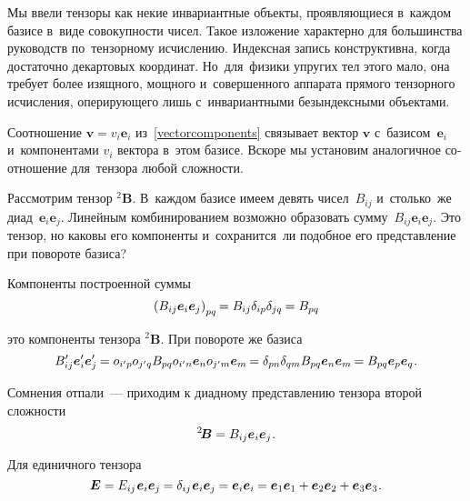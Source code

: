 \label{para:polyadicrepresentation}

\begin{otherlanguage}{russian}

Мы ввели тензоры как некие инвариантные объекты, проявляющиеся в~каждом базисе в~виде совокупности чисел. Такое изложение характерно для большинства руководств по~тензорному исчислению. Индексная запись конструктивна, когда достаточно декартовых координат. Но~для~физики упругих тел этого мало, она требует более изящного, мощного и~совершенного аппарата прямого тензорного исчисления, оперирующего лишь с~инвариантными безындексными объектами.

Соотношение ${\bm{v} = v_i \bm{e}_i}$ из~\eqref{vectorcomponents} связывает вектор ${\bm{v}}$ с~базисом~${\bm{e}_i}$ и~компонентами ${v_i}$ вектора в~этом базисе. Вскоре мы установим аналогичное соотношение для~тензора любой сложности.

Рассмотрим тензор ${^2\!\bm{B}}$. В~каждом базисе имеем девять чисел~${B_{ij}}$ и~столько~же диад~${\bm{e}_i \bm{e}_j}$. Линейным комбинированием возможно образовать сумму~${B_{ij} \bm{e}_i \bm{e}_j}$. Это тензор, но каковы его компоненты и~сохранится~ли подобное его представление при повороте базиса?

Компоненты построенной суммы
\[
\left( B_{ij} \bm{e}_i \bm{e}_j \right)_{pq} \hspace{-0.2ex} = B_{ij} \delta_{ip} \delta_{jq} \hspace{-0.1ex} = B_{pq}
\]

\vspace{-0.1em} \noindent это компоненты тензора ${^2\!\bm{B}}$. При повороте же базиса
\[
B'_{ij} \bm{e}'_{i} \bm{e}'_{j} \hspace{-0.1ex} = o_{i'p} o_{j'q} B_{pq} o_{i'n} \bm{e}_n o_{j'm} \bm{e}_m \hspace{-0.2ex} = \delta_{pn} \delta_{qm} B_{pq} \bm{e}_n \bm{e}_m \hspace{-0.2ex} = B_{pq} \bm{e}_p \bm{e}_q \hspace{.1ex} .
\]

Сомнения отпали~--- приходим к диадному представлению тензора второй сложности
\begin{equation}\label{polyada:2}
^2\!\bm{B} = B_{ij} \bm{e}_i \bm{e}_j \hspace{.1ex} .
\end{equation}

\vspace{-0.2em} Для единичного тензора
\[ \bm{E} =
E_{ij} \hspace{.16ex} \bm{e}_i \bm{e}_j \hspace{-0.1ex} =
\delta_{ij} \hspace{.16ex} \bm{e}_i \bm{e}_j \hspace{-0.1ex} =
\bm{e}_i \bm{e}_i \hspace{-0.1ex} =
\bm{e}_1 \bm{e}_1 + \bm{e}_2 \bm{e}_2 + \bm{e}_3 \bm{e}_3
\hspace{.1ex} . \]


\end{otherlanguage}
